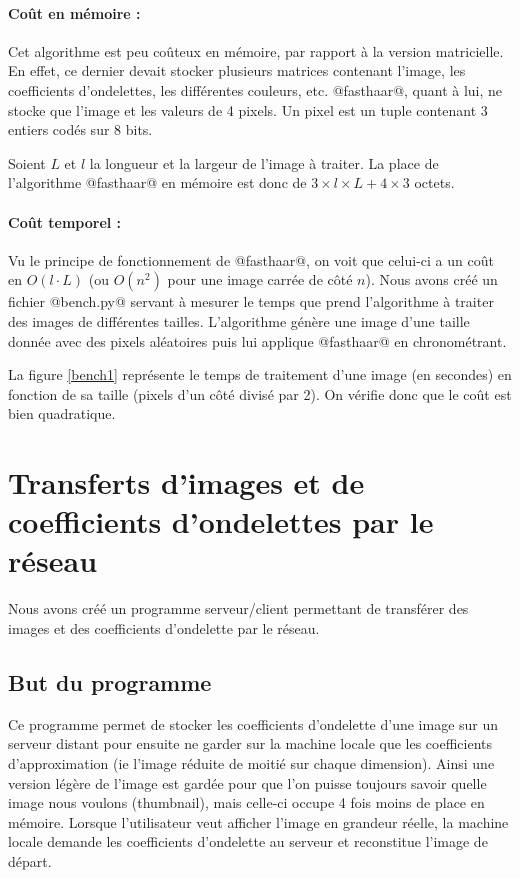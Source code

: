 \documentclass{article}
\begin{document}
\paragraph{Coût en mémoire :}

Cet algorithme est peu coûteux en mémoire, par rapport à la version matricielle. En effet, ce dernier devait stocker plusieurs matrices contenant l'image, les coefficients d'ondelettes, les différentes couleurs, etc. @fasthaar@, quant à lui, ne stocke que l'image et les valeurs de 4 pixels. Un pixel est un tuple contenant 3 entiers codés sur 8 bits. 

Soient $L$ et $l$ la longueur et la largeur de l'image à traiter. 
La place de l'algorithme @fasthaar@ en mémoire est donc de $3\times{}l\times{}L + 4 \times{} 3$ octets.

\paragraph{Coût temporel :}

Vu le principe de fonctionnement de @fasthaar@, on voit que celui-ci a un coût en $O(l\cdot L)$ (ou $O(n^2)$ pour une image carrée de côté $n$). Nous avons créé un fichier @bench.py@ servant à mesurer le temps que prend l'algorithme à traiter des images de différentes tailles. L'algorithme génère une image d'une taille donnée avec des pixels aléatoires puis lui applique @fasthaar@ en chronométrant. 

La figure \ref{bench1} représente le temps de traitement d'une image (en secondes) en fonction de sa taille (pixels d'un côté divisé par 2). On vérifie donc que le coût est bien quadratique. 



\section{Transferts d'images et de coefficients d'ondelettes par le réseau}
\label{net}
Nous avons créé un programme serveur/client permettant de transférer des images et des coefficients d'ondelette par le réseau.

\subsection{But du programme}


Ce programme permet de stocker les coefficients d'ondelette d'une image sur un serveur distant pour ensuite ne garder sur la machine locale que les coefficients d'approximation (ie l'image réduite de moitié sur chaque dimension). Ainsi une version légère de l'image est gardée pour que l'on puisse toujours savoir quelle image nous voulons (thumbnail), mais celle-ci occupe 4 fois moins de place en mémoire. Lorsque l'utilisateur veut afficher l'image en grandeur réelle, la machine locale demande les coefficients d'ondelette au serveur et reconstitue l'image de départ.
\end{document}
